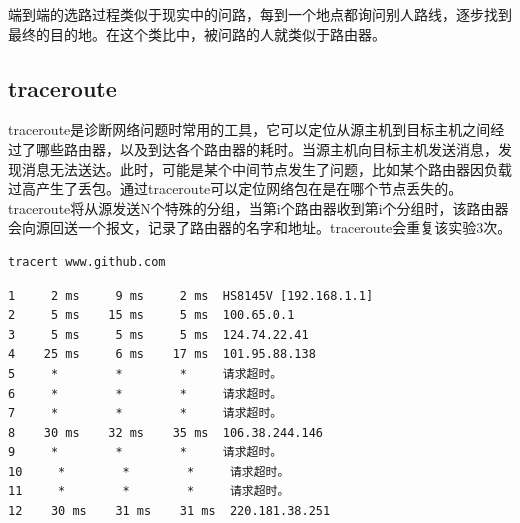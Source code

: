 端到端的选路过程类似于现实中的问路，每到一个地点都询问别人路线，逐步找到最终的目的地。在这个类比中，被问路的人就类似于路由器。\\

\subsection{traceroute}

traceroute是诊断网络问题时常用的工具，它可以定位从源主机到目标主机之间经过了哪些路由器，以及到达各个路由器的耗时。当源主机向目标主机发送消息，发现消息无法送达。此时，可能是某个中间节点发生了问题，比如某个路由器因负载过高产生了丢包。通过traceroute可以定位网络包在是在哪个节点丢失的。\\

traceroute将从源发送N个特殊的分组，当第i个路由器收到第i个分组时，该路由器会向源回送一个报文，记录了路由器的名字和地址。traceroute会重复该实验3次。\\


\begin{lstlisting}
tracert www.github.com
\end{lstlisting}

\begin{tcolorbox}
	\begin{verbatim}
1     2 ms     9 ms     2 ms  HS8145V [192.168.1.1]
2     5 ms    15 ms     5 ms  100.65.0.1
3     5 ms     5 ms     5 ms  124.74.22.41
4    25 ms     6 ms    17 ms  101.95.88.138
5     *        *        *     请求超时。
6     *        *        *     请求超时。
7     *        *        *     请求超时。
8    30 ms    32 ms    35 ms  106.38.244.146
9     *        *        *     请求超时。
10     *        *        *     请求超时。
11     *        *        *     请求超时。
12    30 ms    31 ms    31 ms  220.181.38.251
	\end{verbatim}
\end{tcolorbox}

\newpage